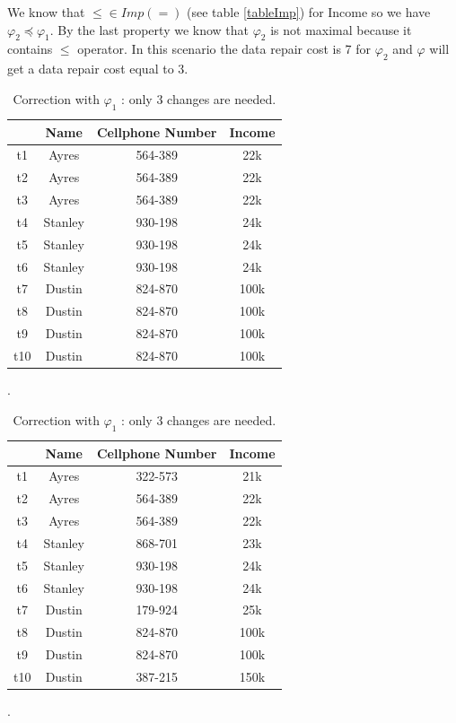 \documentclass[letterpaper, 12pt]{report}
\theoremstyle{definition}
\begin{document}
We know that $\leq \in Imp(=)$ (see table \ref{tableImp}) for Income so we have $\varphi_2 \preceq \varphi_1$. By the last property we know that $\varphi_2$ is not maximal because it contains $\leq$ operator. In this scenario the data repair cost is 7 for $\varphi_2$ and $\varphi$ will get a data repair cost equal to 3. 

\begin{table}[H]
	\parbox{.45\linewidth}{
	\centering
	\begin{tabular}{|c|c c c|}
	\hline
	    & Name & Cellphone Number & Income\\
	\hline
	 t1 & Ayres & \color{red}564-389 & \color{red}22k\\
	 t2 & Ayres & \color{red}564-389 & 22k\\
	 t3 & Ayres & 564-389 & 22k\\
	 t4 & Stanley &\color{red} 930-198 &\color{red}24k\\
	 t5 & Stanley &\color{red} 930-198 & 24k\\
	 t6 & Stanley & 930-198 & 24k\\
	 t7 & Dustin & \color{red}824-870 & \color{red}100k\\
	 t8 & Dustin & \color{red}824-870 & 100k\\
	 t9 & Dustin & 824-870 & 100k\\
	 t10 & Dustin & \color{red}824-870 & \color{red}100k\\
	 \hline
	\end{tabular}
	\caption{Correction with $\varphi_2$: 7 changes needed only for the collumn CP.}.
	}
	\hfill
	\parbox{.45\linewidth}{
	\centering
	\begin{tabular}{|c|c c c|}
	\hline
	    & Name & Cellphone Number & Income\\
	\hline
	 t1 & Ayres & 322-573 & 21k\\
	 t2 & Ayres & \color{red} 564-389 & 22k\\
	 t3 & Ayres & 564-389 & 22k\\
	 t4 & Stanley & 868-701 &23k\\
	 t5 & Stanley & \color{red} 930-198 & 24k\\
	 t6 & Stanley & 930-198 & 24k\\
	 t7 & Dustin & 179-924 & 25k\\
	 t8 & Dustin & \color{red} 824-870 & 100k\\
	 t9 & Dustin & 824-870 & 100k\\
	 t10 & Dustin & 387-215 & 150k\\
	 \hline
	\end{tabular}
	\caption{Correction with $\varphi_1$ : only 3 changes are needed.}.
	}
\end{table}
\end{document}
